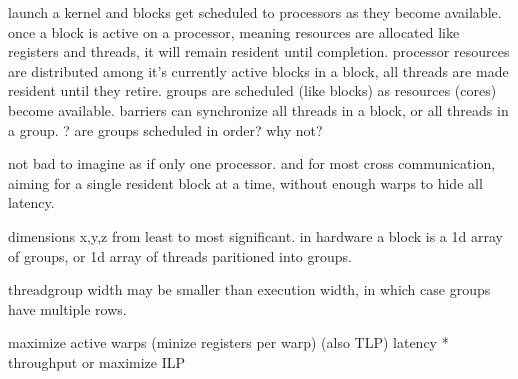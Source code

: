

launch a kernel and blocks get scheduled to processors as they become available.
once a block is active on a processor, meaning resources are allocated like registers and threads, it will remain resident until completion. processor resources are distributed among it's currently active blocks
in a block, all threads are made resident until they retire. 
groups are scheduled (like blocks) as resources (cores) become available.
barriers can synchronize all threads in a block, or all threads in a group.
? are groups scheduled in order? why not?

not bad to imagine as if only one processor.
and for most cross communication, aiming for a single resident block at a time, without enough warps to hide all latency.

dimensions x,y,z from least to most significant.
in hardware a block is a 1d array of groups, or 1d array of threads paritioned into groups.



threadgroup width may be smaller than execution width, in which case groups have multiple rows.

maximize active warps (minize registers per warp) (also TLP)
latency * throughput
or maximize ILP